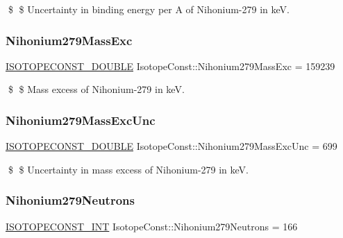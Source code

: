 \$ \$ Uncertainty in binding energy per A of Nihonium-\/279 in keV. \mbox{\label{group___isotope_const-_nihonium-_nh279_gac60fa7b58d42f6f9ad7b7d358ef57c97}} 
\subsubsection{\texorpdfstring{Nihonium279\+Mass\+Exc}{Nihonium279MassExc}}
{\footnotesize\ttfamily \mbox{\hyperlink{group___isotope_const-_macros_ga8f45a7272ce02c0b4c65c44636ed719a}{I\+S\+O\+T\+O\+P\+E\+C\+O\+N\+S\+T\+\_\+\+D\+O\+U\+B\+LE}} Isotope\+Const\+::\+Nihonium279\+Mass\+Exc = 159239}

\$ \$ Mass excess of Nihonium-\/279 in keV. \mbox{\label{group___isotope_const-_nihonium-_nh279_ga3102d8e22365cbc451edccebf997d3cf}} 
\subsubsection{\texorpdfstring{Nihonium279\+Mass\+Exc\+Unc}{Nihonium279MassExcUnc}}
{\footnotesize\ttfamily \mbox{\hyperlink{group___isotope_const-_macros_ga8f45a7272ce02c0b4c65c44636ed719a}{I\+S\+O\+T\+O\+P\+E\+C\+O\+N\+S\+T\+\_\+\+D\+O\+U\+B\+LE}} Isotope\+Const\+::\+Nihonium279\+Mass\+Exc\+Unc = 699}

\$ \$ Uncertainty in mass excess of Nihonium-\/279 in keV. \mbox{\label{group___isotope_const-_nihonium-_nh279_ga1c8884411fa2aaa2b6c4be7a45e0a468}} 
\subsubsection{\texorpdfstring{Nihonium279\+Neutrons}{Nihonium279Neutrons}}
{\footnotesize\ttfamily \mbox{\hyperlink{group___isotope_const-_macros_ga5f18360b3e99483a35c32d789e62621c}{I\+S\+O\+T\+O\+P\+E\+C\+O\+N\+S\+T\+\_\+\+I\+NT}} Isotope\+Const\+::\+Nihonium279\+Neutrons = 166}

